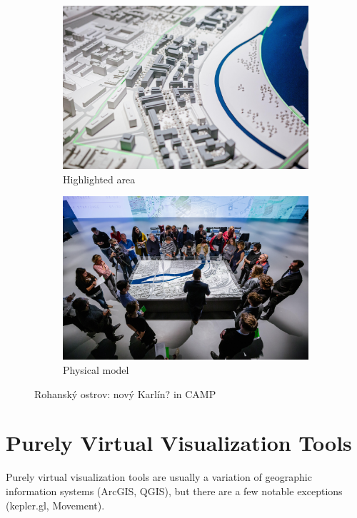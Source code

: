 \begin{figure}[h]
    \centering
    \begin{subfigure}[t]{0.49\linewidth}
        \centering
        \includegraphics[width=\linewidth]{figures/rohan1.jpg}
        \caption{Highlighted area \cite{iprRohanImages}}
        \label{fig:rohanhighlight}
    \end{subfigure}
    \begin{subfigure}[t]{0.49\linewidth}
        \centering
        \includegraphics[width=\linewidth]{figures/rohan3.jpg}
        \caption{Physical model \cite{iprRohanImages}}
        \label{fig:rohanmodel}
    \end{subfigure}
    \caption{Rohanský ostrov: nový Karlín? in CAMP}
    \label{fig:rohan}
\end{figure}


\section{Purely Virtual Visualization Tools}
\label{sec:virtualtools}
Purely virtual visualization tools are usually a variation of geographic information systems (ArcGIS, QGIS), but there are a few notable exceptions (kepler.gl, Movement). 

